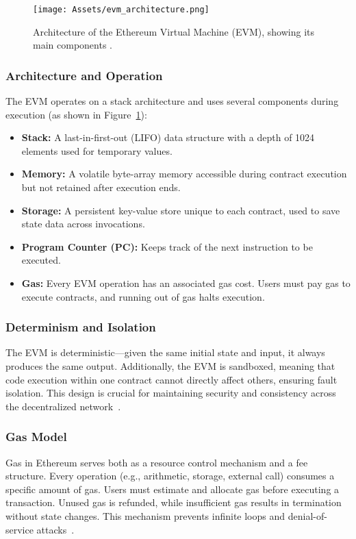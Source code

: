 \begin{figure}[H]
    \centering
    \texttt{[image: Assets/evm\_architecture.png]}
    \caption{Architecture of the Ethereum Virtual Machine (EVM), showing its main components \cite{wood2014ethereum}.}
    \label{fig:evm_architecture}
\end{figure}


\subsubsection{Architecture and Operation}
The EVM operates on a stack architecture and uses several components during execution (as shown in Figure~\ref{fig:evm_architecture}):
\begin{itemize}
  \item \textbf{Stack:} A last-in-first-out (LIFO) data structure with a depth of 1024 elements used for temporary values.
  \item \textbf{Memory:} A volatile byte-array memory accessible during contract execution but not retained after execution ends.
  \item \textbf{Storage:} A persistent key-value store unique to each contract, used to save state data across invocations.
  \item \textbf{Program Counter (PC):} Keeps track of the next instruction to be executed.
  \item \textbf{Gas:} Every EVM operation has an associated gas cost. Users must pay gas to execute contracts, and running out of gas halts execution.
\end{itemize}

\subsubsection{Determinism and Isolation}
The EVM is deterministic—given the same initial state and input, it always produces the same output. Additionally, the EVM is sandboxed, meaning that code execution within one contract cannot directly affect others, ensuring fault isolation. This design is crucial for maintaining security and consistency across the decentralized network~\cite{wood2014ethereum}.
\subsubsection{Gas Model}
Gas in Ethereum serves both as a resource control mechanism and a fee structure. Every operation (e.g., arithmetic, storage, external call) consumes a specific amount of gas. Users must estimate and allocate gas before executing a transaction. Unused gas is refunded, while insufficient gas results in termination without state changes. This mechanism prevents infinite loops and denial-of-service attacks~\cite{buterin2014whitepaper}.

